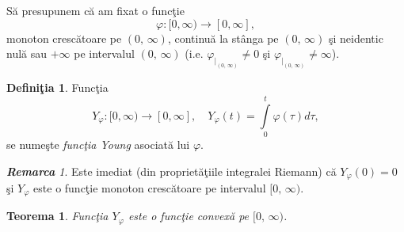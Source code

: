 \documentclass[ a4paper, 12pt]{report}
\newtheorem{theorem}{\bf Teorema}[section]
\theoremstyle{definition}
\newtheorem{definition}{\bf Defini\c tia}[section]
\theoremstyle{remark}
\newtheorem{remarc}{\bf Remarca}[section]
\numberwithin{equation}{section}
\begin{document}
S\u a presupunem c\u a am fixat o func\c tie
$$\varphi : [0,\infty) \rightarrow [0,\infty],$$
monoton cresc\u atoare pe $(0, \, \infty)$, continu\u a la st\^ anga pe $(0, \, \infty)$ \c si neidentic nul\u a sau $+\infty$ pe intervalul $(0,\, \infty)$ (i.e. $\varphi_{|_{(0,\, \infty)}} \not= 0$ \c si $\varphi_{|_{(0,\, \infty)}}\not= \infty$).
\begin{definition}
Func\c tia
$$Y_\varphi : [0,\infty) \rightarrow [0,\infty], \quad Y_\varphi(t) = \int\limits_{0}^{t}\varphi(\tau) d\tau,$$
se nume\c ste \emph{func\c tia Young} asociat\u a lui $\varphi$.
\end{definition}

\begin{remarc} Este imediat (din propriet\u a\c tiile integralei Riemann) c\u a $Y_\varphi (0) = 0$ \c si $Y_\varphi$ este o func\c tie monoton cresc\u atoare pe intervalul $[0,\, \infty)$.
\end{remarc}

\begin{theorem}
Func\c tia $Y_\varphi$ este o func\c tie convex\u a pe $[0,\, \infty)$.
\end{theorem}
\end{document}
